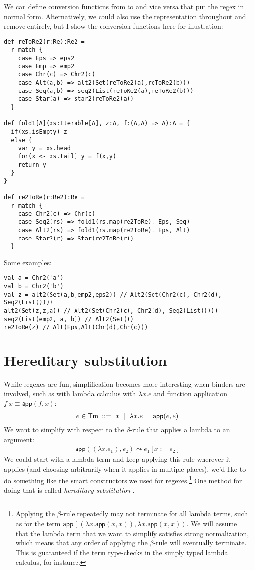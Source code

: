We can define conversion functions from  to  and vice versa that put the regex in normal form.
Alternatively, we could also use the  representation throughout and remove  entirely, but I show the conversion functions here for illustration:

\begin{lstlisting}
def reToRe2(r:Re):Re2 =
  r match {
    case Eps => eps2
    case Emp => emp2
    case Chr(c) => Chr2(c)
    case Alt(a,b) => alt2(Set(reToRe2(a),reToRe2(b)))
    case Seq(a,b) => seq2(List(reToRe2(a),reToRe2(b)))
    case Star(a) => star2(reToRe2(a))
  }

def fold1[A](xs:Iterable[A], z:A, f:(A,A) => A):A = {
  if(xs.isEmpty) z
  else {
    var y = xs.head
    for(x <- xs.tail) y = f(x,y)
    return y
  }
}

def re2ToRe(r:Re2):Re =
  r match {
    case Chr2(c) => Chr(c)
    case Seq2(rs) => fold1(rs.map(re2ToRe), Eps, Seq)
    case Alt2(rs) => fold1(rs.map(re2ToRe), Eps, Alt)
    case Star2(r) => Star(re2ToRe(r))
  }
\end{lstlisting}

Some examples:

\begin{lstlisting}
val a = Chr2('a')
val b = Chr2('b')
val z = alt2(Set(a,b,emp2,eps2)) // Alt2(Set(Chr2(c), Chr2(d), Seq2(List())))
alt2(Set(z,z,a)) // Alt2(Set(Chr2(c), Chr2(d), Seq2(List())))
seq2(List(emp2, a, b)) // Alt2(Set())
re2ToRe(z) // Alt(Eps,Alt(Chr(d),Chr(c)))
\end{lstlisting}


\section{Hereditary substitution}

\newcommand{\ap}{\mathsf{app}}
\newcommand{\steps}{\leadsto}

While regexes are fun, simplification becomes more interesting when binders are involved, such as with lambda calculus with $\lambda x. e$ and function application $f\ x \equiv \ap(f,x)$:
\begin{align*}
  e \in \mathsf{Tm} \ ::=\  x \md \lambda x. e \md \ap(e,e)
\end{align*}
We want to simplify with respect to the $\beta$-rule that applies a lambda to an argument:
\begin{align*}
  \ap((\lambda x. e_1), e_2) \steps e_1[x := e_2]
\end{align*}
We could start with a lambda term and keep applying this rule wherever it applies (and choosing arbitrarily when it applies in multiple places), we'd like to do something like the smart constructors we used for regexes.\footnote{Applying the $\beta$-rule repeatedly may not terminate for all lambda terms, such as for the term $\ap((\lambda x. \ap(x,x)), \lambda x. \ap(x,x))$. We will assume that the lambda term that we want to simplify satisfies strong normalization, which means that any order of applying the $\beta$-rule will eventually terminate. This is guaranteed if the term type-checks in the simply typed lambda calculus, for instance.}
One method for doing that is called \emph{hereditary substitution} \cite{keller:inria-00520606}.

